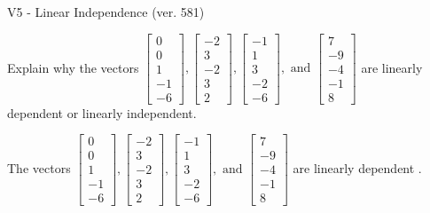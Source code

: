 \begin{exercise}
  \begin{exerciseTitle}V5 - Linear Independence (ver. 581)\end{exerciseTitle}
  \begin{exerciseStatement}
    Explain why the vectors \(\left[\begin{array}{r}
0 \\
0 \\
1 \\
-1 \\
-6
\end{array}\right] , \left[\begin{array}{r}
-2 \\
3 \\
-2 \\
3 \\
2
\end{array}\right] , \left[\begin{array}{r}
-1 \\
1 \\
3 \\
-2 \\
-6
\end{array}\right] , \text{ and } \left[\begin{array}{r}
7 \\
-9 \\
-4 \\
-1 \\
8
\end{array}\right]\) are linearly dependent or linearly independent.	


  \end{exerciseStatement}
  \begin{exerciseAnswer}
   The vectors \(\left[\begin{array}{r}
0 \\
0 \\
1 \\
-1 \\
-6
\end{array}\right] , \left[\begin{array}{r}
-2 \\
3 \\
-2 \\
3 \\
2
\end{array}\right] , \left[\begin{array}{r}
-1 \\
1 \\
3 \\
-2 \\
-6
\end{array}\right] , \text{ and } \left[\begin{array}{r}
7 \\
-9 \\
-4 \\
-1 \\
8
\end{array}\right]\) are 
  	 linearly dependent  .
  


  \end{exerciseAnswer}
\end{exercise}